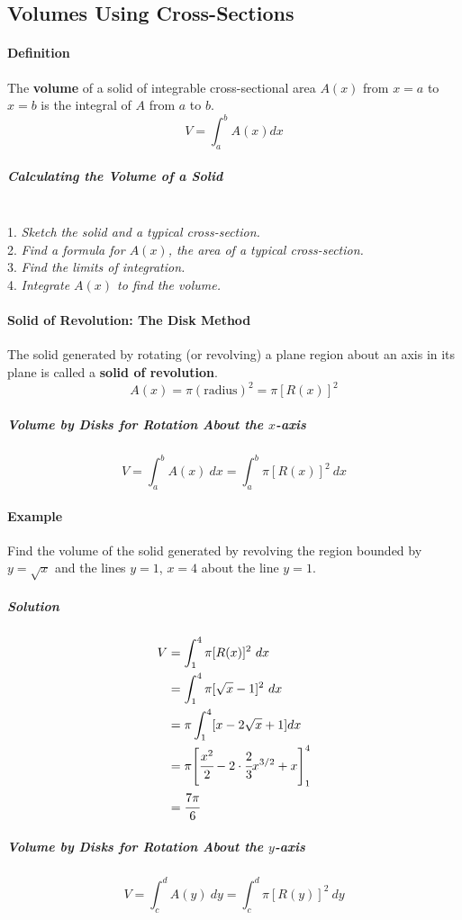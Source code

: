 \documentclass{article}
\begin{document}
        \subsection{Volumes Using Cross-Sections}
            \paragraph{Definition} The \textbf{volume} of a solid of integrable cross-sectional area $A(x)$ from $x=a$ to $x=b$ is the integral of $A$ from $a$ to $b$.
            \[V=\int_a^b A(x)dx\]
                \subparagraph{Calculating the Volume of a Solid}
                \text{}\\
                1. \textit{Sketch the solid and a typical cross-section.}\\
                2. \textit{Find a formula for $A(x)$, the area of a typical cross-section.}\\
                3. \textit{Find the limits of integration.}\\
                4. \textit{Integrate $A(x)$ to find the volume.}
            \paragraph{Solid of Revolution: The Disk Method} The solid generated by rotating (or revolving) a plane region about an axis in its plane is called a \textbf{solid of revolution}.
            \[A(x)=\pi (\text{radius})^2=\pi [R(x)]^2\]
                \subparagraph{Volume by Disks for Rotation About the $x$-axis}
                \[V=\int_a^b A(x)\ dx=\int_a^b\pi [R(x)]^2\ dx\]
            \paragraph{Example} Find the volume of the solid generated by revolving the region bounded by $y=\sqrt{x}$ and the lines $y=1$, $x=4$ about the line $y=1$.
                \subparagraph{Solution}
                \begin{equation}
                    \begin{aligned}
                        V&=\int_1^4 \pi[R(x)]^2\ dx\\
                        &=\int_1^4 \pi[\sqrt{x}-1]^2\ dx\\
                        &=\pi \int_1^4[x-2\sqrt{x}+1] dx\\
                        &=\pi \Bigg [\cfrac{x^2}{2}-2\cdot\cfrac{2}{3}x^{3/2}+x\Bigg]_1^4\\
                        &=\cfrac{7\pi}{6}
                    \end{aligned}
                \end{equation}
                \subparagraph{Volume by Disks for Rotation About the $y$-axis}
                \[V=\int_c^d A(y)\ dy=\int_c^d\pi [R(y)]^2\ dy\]
\end{document}

